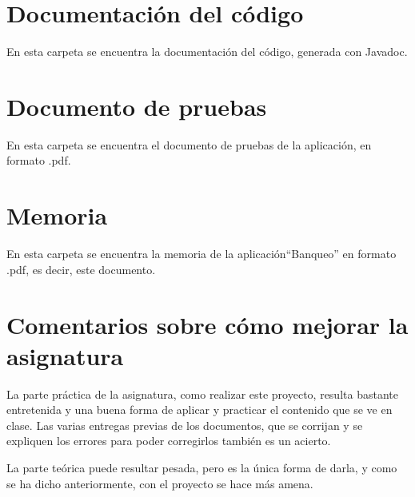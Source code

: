 \documentclass[12pt]{article}
\begin{document}
\section{Documentación del código}
En esta carpeta se encuentra la documentación del código, generada con Javadoc.


\section{Documento de pruebas}
En esta carpeta se encuentra el documento de pruebas de la aplicación, en formato .pdf.


\section{Memoria}
En esta carpeta se encuentra la memoria de la aplicación``Banqueo'' en formato .pdf, es decir, este documento.


\section*{Comentarios sobre cómo mejorar la asignatura}
La parte práctica de la asignatura, como realizar este proyecto, resulta bastante entretenida y una buena forma de aplicar y practicar el contenido que se ve en clase. Las varias entregas previas de los documentos, que se corrijan y se expliquen los errores para poder corregirlos también es un acierto.

La parte teórica puede resultar pesada, pero es la única forma de darla, y como se ha dicho anteriormente, con el proyecto se hace más amena.
\end{document}
